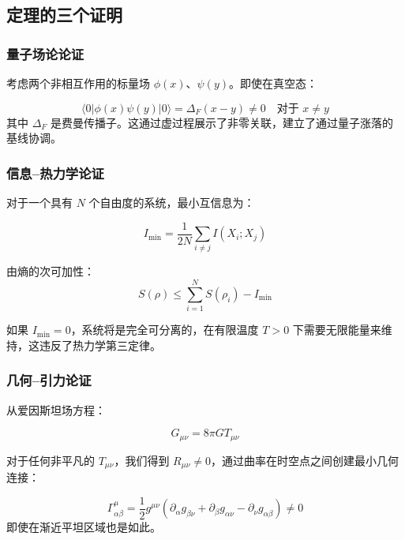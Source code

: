\documentclass[11pt,a4paper]{article}
\begin{document}
	\subsection{定理的三个证明}
	
	\subsubsection{量子场论论证}
	
	考虑两个非相互作用的标量场 $\phi(x)$、$\psi(y)$。即使在真空态：
	
	\begin{equation}
		\langle 0 | \phi(x) \psi(y) | 0 \rangle = \Delta_F(x-y) \neq 0 \quad \text{对于 } x \neq y
	\end{equation}
	其中 $\Delta_F$ 是费曼传播子。这通过虚过程展示了非零关联，建立了通过量子涨落的基线协调。
	
	\subsubsection{信息–热力学论证}
	
	对于一个具有 $N$ 个自由度的系统，最小互信息为：
	
	\begin{equation}
		I_{\min} = \frac{1}{2N} \sum_{i \neq j} I(X_i; X_j)
	\end{equation}
	
	由熵的次可加性：
	\begin{equation}
		S(\rho) \leq \sum_{i=1}^N S(\rho_i) - I_{\min}
	\end{equation}
	
	如果 $I_{\min} = 0$，系统将是完全可分离的，在有限温度 $T > 0$ 下需要无限能量来维持，这违反了热力学第三定律。
	
	\subsubsection{几何–引力论证}
	
	从爱因斯坦场方程：
	
	\begin{equation}
		G_{\mu\nu} = 8\pi G T_{\mu\nu}
	\end{equation}
	
	对于任何非平凡的 $T_{\mu\nu}$，我们得到 $R_{\mu\nu} \neq 0$，通过曲率在时空点之间创建最小几何连接：
	
	\begin{equation}
		\Gamma^\mu_{\alpha\beta} = \frac{1}{2} g^{\mu\nu}(\partial_\alpha g_{\beta\nu} + \partial_\beta g_{\alpha\nu} - \partial_\nu g_{\alpha\beta}) \neq 0
	\end{equation}
	即使在渐近平坦区域也是如此。
	
\end{document}
